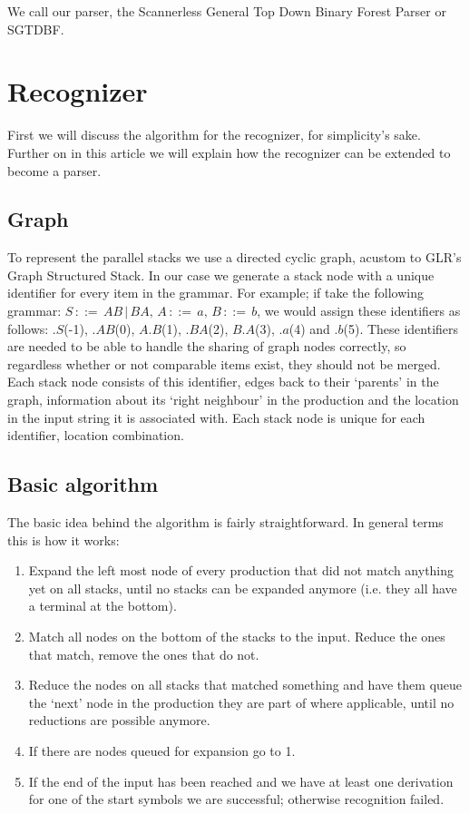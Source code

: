 \documentclass[a4paper,10pt]{article}
\begin{document}
We call our parser, the Scannerless General Top Down Binary Forest Parser or SGTDBF.

\section{Recognizer}

First we will discuss the algorithm for the recognizer, for simplicity's sake. Further on in this article we will explain how the recognizer can be extended to become a parser.

\subsection{Graph}

To represent the parallel stacks we use a directed cyclic graph, acustom to GLR's Graph Structured Stack. In our case we generate a stack node with a unique identifier for every item in the grammar. For example; if take the following grammar: $S\,::=\,AB\,|\,BA,\,A\,::=\,a,\,B\,::=\,b$, we would assign these identifiers as follows: $.S$(-1), $.AB$(0), $A.B$(1), $.BA$(2), $B.A$(3), $.a$(4) and $.b$(5). These identifiers are needed to be able to handle the sharing of graph nodes correctly, so regardless whether or not comparable items exist, they should not be merged. Each stack node consists of this identifier, edges back to their `parents' in the graph, information about its `right neighbour' in the production and the location in the input string it is associated with. Each stack node is unique for each identifier, location combination.

\subsection{Basic algorithm}

The basic idea behind the algorithm is fairly straightforward. In general terms this is how it works:

\begin{enumerate}
 \setlength{\itemsep}{0pt}
 \setlength{\parskip}{0pt}
 \setlength{\parsep}{0pt}

 \item Expand the left most node of every production that did not match anything yet on all stacks, until no stacks can be expanded anymore (i.e. they all have a terminal at the bottom).
 \item Match all nodes on the bottom of the stacks to the input. Reduce the ones that match, remove the ones that do not.
 \item Reduce the nodes on all stacks that matched something and have them queue the `next' node in the production they are part of where applicable, until no reductions are possible anymore.
 \item If there are nodes queued for expansion go to 1.
 \item If the end of the input has been reached and we have at least one derivation for one of the start symbols we are successful; otherwise recognition failed.
\end{enumerate}
\end{document}

